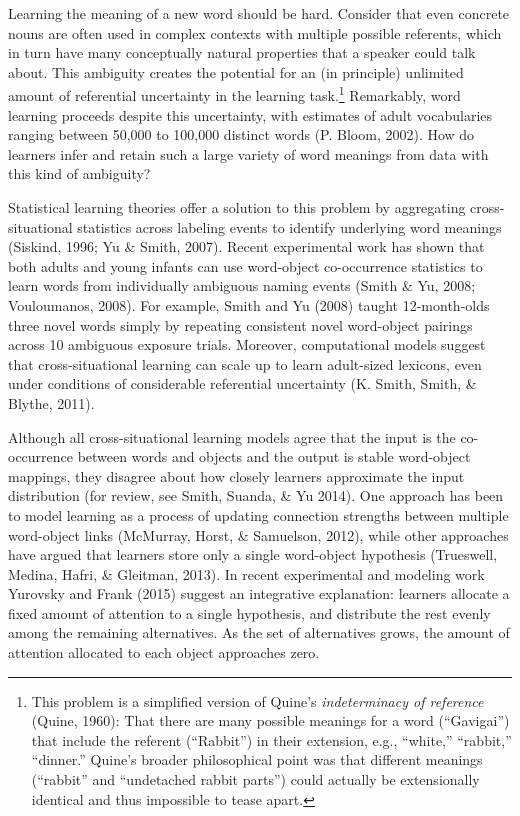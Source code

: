 \documentclass[authoryear, review]{elsarticle}
\begin{document}
Learning the meaning of a new word should be hard. Consider that even
concrete nouns are often used in complex contexts with multiple possible
referents, which in turn have many conceptually natural properties that
a speaker could talk about. This ambiguity creates the potential for an
(in principle) unlimited amount of referential uncertainty in the
learning task.\footnote{This problem is a simplified version of Quine's
  \textit{indeterminacy of reference} (Quine, 1960): That there are many
  possible meanings for a word (``Gavigai'') that include the referent
  (``Rabbit'') in their extension, e.g., ``white,'' ``rabbit,''
  ``dinner.'' Quine's broader philosophical point was that different
  meanings (``rabbit'' and ``undetached rabbit parts'') could actually
  be extensionally identical and thus impossible to tease apart.}
Remarkably, word learning proceeds despite this uncertainty, with
estimates of adult vocabularies ranging between 50,000 to 100,000
distinct words (P. Bloom, 2002). How do learners infer and retain such a
large variety of word meanings from data with this kind of ambiguity?

Statistical learning theories offer a solution to this problem by
aggregating cross-situational statistics across labeling events to
identify underlying word meanings (Siskind, 1996; Yu \& Smith, 2007).
Recent experimental work has shown that both adults and young infants
can use word-object co-occurrence statistics to learn words from
individually ambiguous naming events (Smith \& Yu, 2008; Vouloumanos,
2008). For example, Smith and Yu (2008) taught 12-month-olds three novel
words simply by repeating consistent novel word-object pairings across
10 ambiguous exposure trials. Moreover, computational models suggest
that cross-situational learning can scale up to learn adult-sized
lexicons, even under conditions of considerable referential uncertainty
(K. Smith, Smith, \& Blythe, 2011).

Although all cross-situational learning models agree that the input is
the co-occurrence between words and objects and the output is stable
word-object mappings, they disagree about how closely learners
approximate the input distribution (for review, see Smith, Suanda, \& Yu
2014). One approach has been to model learning as a process of updating
connection strengths between multiple word-object links (McMurray,
Horst, \& Samuelson, 2012), while other approaches have argued that
learners store only a single word-object hypothesis (Trueswell, Medina,
Hafri, \& Gleitman, 2013). In recent experimental and modeling work
Yurovsky and Frank (2015) suggest an integrative explanation: learners
allocate a fixed amount of attention to a single hypothesis, and
distribute the rest evenly among the remaining alternatives. As the set
of alternatives grows, the amount of attention allocated to each object
approaches zero.
\end{document}

